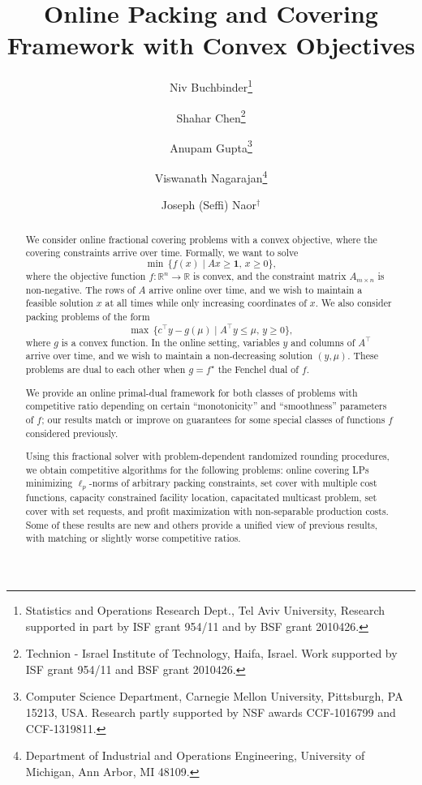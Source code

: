 \documentclass[letterpaper,11pt]{article}
\date{}
\def \RR   {{\mathbb R}}
\newcommand{\trans}{\intercal}
\begin{document}
\title{Online Packing and Covering Framework with Convex Objectives}
\date{}
\author{Niv Buchbinder\thanks{Statistics and Operations Research Dept., Tel Aviv University, Research supported in part by ISF grant
954/11 and by BSF grant 2010426.}
\and
Shahar Chen\thanks{Technion - Israel Institute of Technology, Haifa, Israel. Work
supported by ISF grant 954/11 and BSF grant 2010426.}
\and
Anupam Gupta\thanks{Computer Science Department, Carnegie Mellon
    University, Pittsburgh, PA 15213, USA. Research partly supported by
    NSF awards CCF-1016799 and CCF-1319811.}
\and
Viswanath Nagarajan\thanks{Department of Industrial and Operations
  Engineering, University of Michigan, Ann Arbor, MI 48109.}
\and
Joseph (Seffi) Naor$^\dagger$}


\maketitle
\begin{abstract}
  We consider online fractional covering problems with a convex
  objective, where the covering constraints arrive over time. Formally,
  we want to solve
  \[ \min\,\{ f(x) \mid Ax\ge \mathbf{1},\, x\ge 0\},\] where the
  objective function $f:\RR^n\rightarrow \RR$ is convex, and the
  constraint matrix $A_{m\times n}$ is non-negative. The rows of $A$
  arrive online over time, and we wish to maintain a feasible solution
  $x$ at all times while only increasing coordinates of $x$.  We also
  consider packing problems of the form
  \[ \max\,\{ c^\trans y - g(\mu) \mid A^\trans y \le \mu,\,
  y\ge 0\},\] where $g$ is a convex function. In the online setting,
  variables $y$ and columns of $A^\trans$ arrive over time, and we wish
  to maintain a non-decreasing solution $(y,\mu)$. These problems are dual to each other when $g = f^\star$ the Fenchel
  dual of $f$.

  \medskip We provide an online primal-dual framework for both classes
  of problems with competitive ratio depending on certain
  ``monotonicity'' and ``smoothness'' parameters of $f$; our results
  match or improve on guarantees for some special classes of
  functions $f$ considered previously.


  \medskip Using this fractional solver  with problem-dependent
  randomized rounding procedures, we obtain competitive algorithms for
  the following problems: online covering LPs minimizing $\ell_p$-norms
  of arbitrary packing constraints, set cover with multiple cost
  functions, capacity constrained facility location, capacitated
  multicast problem, set cover with set requests, and profit maximization with non-separable production costs. Some of these
  results are new and others provide a unified view of previous results,
  with matching or slightly worse competitive ratios.
\end{abstract}
\end{document}
